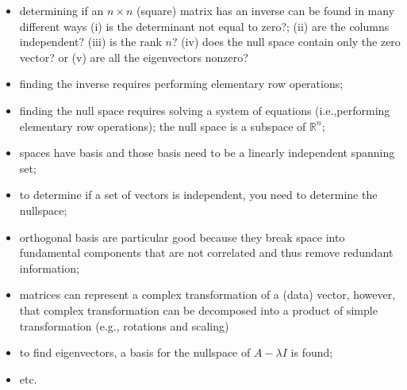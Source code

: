  \begin{itemize}
 
  \item determining if an $n \times n$ (square) matrix has an inverse can be found in many different ways (i) is the determinant not equal to zero?; (ii) are the columns independent? (iii) is the rank $n$? (iv) does the null space contain only the zero vector? or (v) are all the eigenvectors nonzero?

 
  \item finding the inverse requires performing elementary row operations;

 \item finding the null space requires solving a system of equations (i.e.,performing elementary row operations);  the null space is a subspace of $\mathbb{R}^n$;
 
 \item  spaces have basis and those basis need to be a linearly independent spanning set; 
 
 \item to determine if a set of vectors is independent, you need to determine the nullspace; 
 
 \item orthogonal basis are particular good because they break space into fundamental components that are not correlated and thus remove redundant information; 
 
 \item matrices can represent a complex transformation of a (data) vector, however, that complex transformation can be decomposed into a product of simple transformation (e.g., rotations and scaling)
 
 
 
 \item to find eigenvectors, a basis for the nullspace of $A-\lambda I$ is found;
 
 
 \item etc.  
 
 \end{itemize}
 
 




 
 
    


% 
